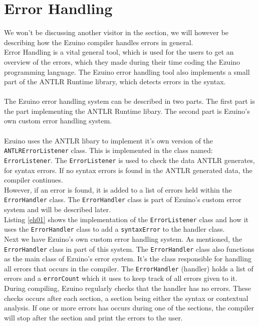 \section{Error Handling}\label{error-handling-chap}
We won't be discussing another visitor in the section, we will however be describing how the Ezuino compiler handles errors in general.\\
Error Handling is a vital general tool, which is used for the users to get an overview of the errors, which they made during their time coding the Ezuino programming language. The Ezuino error handling tool also implements a small part of the ANTLR Runtime library, which detects errors in the syntax.
\\\\
The Ezuino error handling system can be described in two parts. The first part is the part implementing the ANTLR Runtime libary. The second part is Ezuino's own custom error handling system.
\\\\
Ezuino uses the ANTLR libary to implement it's own version of the \texttt{ANTLRErrorListener} class. This is implemented in the class named: \texttt{ErrorListener}. The \texttt{ErrorListener} is used to check the data ANTLR generates, for syntax errors. If no syntax errors is found in the ANTLR generated data, the compiler continues.\\
However, if an error is found, it is added to a list of errors held within the \texttt{ErrorHandler} class. The \texttt{ErrorHandler} class is part of Ezuino's custom error system and will be described later.\\
Listing \ref{eh01} shows the implementation of the \texttt{ErrorListener} class and how it uses the \texttt{ErrorHandler} class to add a \texttt{syntaxError} to the handler class.\\

\noindent\newline
Next we have Ezuino's own custom error handling system. As mentioned, the \texttt{ErrorHandler} class in part of this system. The \texttt{ErrorHandler} class also functions as the main class of Ezuino's error system. It's the class responsible for handling all errors that occurs in the compiler. The \texttt{ErrorHandler} (handler) holds a list of errors and a \texttt{errorCount} which it uses to keep track of all errors given to it. During compiling, Ezuino regularly checks that the handler has no errors. These checks occurs after each section, a section being either the syntax or contextual analysis. If one or more errors has occurs during one of the sections, the compiler will stop after the section and print the errors to the user.\\
